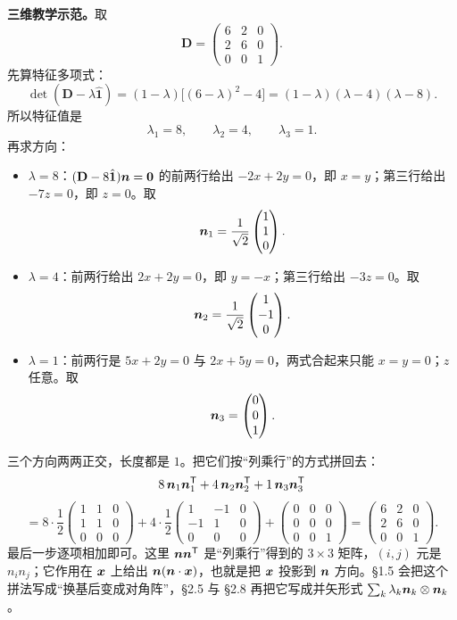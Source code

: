 \documentclass[11pt]{ctexart}
\newcommand{\ten}[1]{\mathbf{#1}}
\newcommand{\unitd}{\hat{\ten{1}}}
\begin{document}
\textbf{三维教学示范。}取
\[
\ten D=\begin{pmatrix}6&2&0\\2&6&0\\0&0&1\end{pmatrix}.
\]
先算特征多项式：
\[
\det(\ten D-\lambda\unitd)
=(1-\lambda)\bigl[(6-\lambda)^2-4\bigr]
=(1-\lambda)(\lambda-4)(\lambda-8).
\]
所以特征值是
\[
\lambda_1=8,\qquad \lambda_2=4,\qquad \lambda_3=1.
\]
再求方向：
\begin{itemize}[leftmargin=1.8em,itemsep=2pt]
\item $\lambda=8$：$(\ten D-8\unitd)\vect n=\vect0$ 的前两行给出 $-2x+2y=0$，即 $x=y$；第三行给出 $-7z=0$，即 $z=0$。取
\[
\boldsymbol{n}_1=\frac{1}{\sqrt2}\begin{pmatrix}1\\1\\0\end{pmatrix}.
\]
\item $\lambda=4$：前两行给出 $2x+2y=0$，即 $y=-x$；第三行给出 $-3z=0$。取
\[
\boldsymbol{n}_2=\frac{1}{\sqrt2}\begin{pmatrix}1\\-1\\0\end{pmatrix}.
\]
\item $\lambda=1$：前两行是 $5x+2y=0$ 与 $2x+5y=0$，两式合起来只能 $x=y=0$；$z$ 任意。取
\[
\boldsymbol{n}_3=\begin{pmatrix}0\\0\\1\end{pmatrix}.
\]
\end{itemize}
三个方向两两正交，长度都是 $1$。把它们按“列乘行”的方式拼回去：
\[
8\,\boldsymbol{n}_1\boldsymbol{n}_1^{\mathsf T}
+4\,\boldsymbol{n}_2\boldsymbol{n}_2^{\mathsf T}
+1\,\boldsymbol{n}_3\boldsymbol{n}_3^{\mathsf T}
\]
\[
=8\cdot\frac12\begin{pmatrix}1&1&0\\1&1&0\\0&0&0\end{pmatrix}
+4\cdot\frac12\begin{pmatrix}1&-1&0\\-1&1&0\\0&0&0\end{pmatrix}
+\begin{pmatrix}0&0&0\\0&0&0\\0&0&1\end{pmatrix}
=\begin{pmatrix}6&2&0\\2&6&0\\0&0&1\end{pmatrix}.
\]
最后一步逐项相加即可。这里 $\boldsymbol{n}\boldsymbol{n}^{\mathsf T}$ 是“列乘行”得到的 $3\times3$ 矩阵，$(i,j)$ 元是 $n_in_j$；它作用在 $\boldsymbol{x}$ 上给出 $\boldsymbol{n}(\boldsymbol{n}\cdot\boldsymbol{x})$，也就是把 $\boldsymbol{x}$ 投影到 $\boldsymbol{n}$ 方向。\S1.5 会把这个拼法写成“换基后变成对角阵”，\S2.5 与 \S2.8 再把它写成并矢形式 $\sum_k\lambda_k\boldsymbol{n}_k\otimes\boldsymbol{n}_k$。
\end{document}
